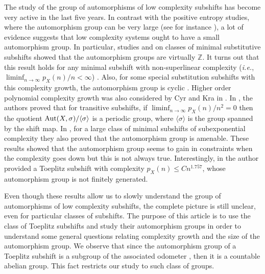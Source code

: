 \documentclass{daj}
\theoremstyle{plain}
\theoremstyle{definition}
\begin{document}
The study of the group of automorphisms of low complexity subshifts has become very active in the last five years. In contrast with the positive entropy studies, where the automorphism group can be very large (see for instance \cite{BoyleLindRudolph}), a lot of evidence suggests that low complexity systems ought to have a small automorphism group. In particular, studies \cite{SaloTorma} and \cite{Olli} on classes of minimal substitutive subshifts showed that the automorphism groups are virtually $\mathbb{Z}$. It turns out that this result holds for any minimal subshift with non-superlinear complexity (\emph{i.e.}, $\displaystyle\liminf_{n \to \infty} p_X(n)/n<\infty$)  \cite{CyrKra2,DonosoDurandMaassPetite}. Also, for some special substitution subshifts with this complexity growth, the automorphism group is cyclic \cite{CovenQuasYassawi}. 
Higher order polynomial complexity growth was also considered by Cyr and Kra in \cite{CyrKra,CyrKra3}. 
In \cite{CyrKra}, the authors proved that for transitive subshifts, if 
$\displaystyle\liminf_{n \to \infty} p_X(n)/n^2=0$ then the quotient ${\rm Aut}(X,\sigma)/\langle \sigma \rangle$ is a periodic group, where $\langle \sigma \rangle$ is the group spanned by the shift map. In \cite{CyrKra3}, for a large class of minimal subshifts of subexponential complexity they also proved that the automorphism group is amenable.  
These results showed that the automorphism group seems to gain in constraints when the complexity goes down but this is not always true. Interestingly, in \cite{Salo} the author provided a Toeplitz subshift with complexity $p_X(n)\leq Cn^{1.757}$, whose automorphism group is not finitely generated. 

Even though these results allow us to slowly understand the group of automorphisms of low complexity subshifts, the complete picture is still unclear, even for particular classes of subshifts. The purpose of this article is to use the class of Toeplitz subshifts and study their automorphism groups in order to understand some general questions relating complexity growth and the size of the automorphism group. We observe that since the automorphism group of a Toeplitz subshift is a subgroup of the associated odometer \cite{DonosoDurandMaassPetite}, then it is a countable abelian group. This fact restricts our study to such class of groups. 
\end{document}
